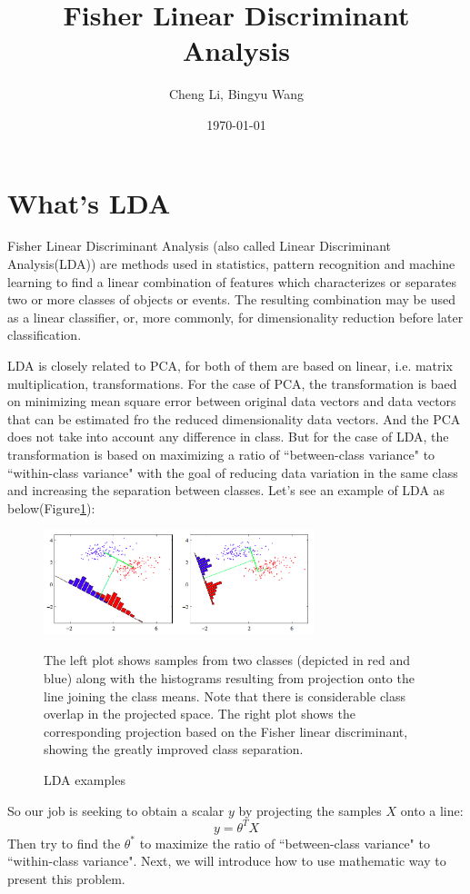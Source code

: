 \documentclass[a4paper]{article}
\title{Fisher Linear Discriminant Analysis}
\author{Cheng Li, Bingyu Wang}
\date{\today}
\begin{document}
\maketitle
\section{What's LDA}


Fisher Linear Discriminant Analysis (also called Linear Discriminant Analysis(LDA)) are methods used in statistics, pattern recognition and machine learning to find a linear combination of features which characterizes or separates two or more classes of objects or events. The resulting combination may be used as a linear classifier, or, more commonly, for dimensionality reduction before later classification.

LDA is closely related to PCA, for both of them are based on linear, i.e. matrix multiplication, transformations. For the case of PCA, the transformation is baed on minimizing mean square error between original data vectors and data vectors that can be estimated fro the reduced dimensionality data vectors. And the PCA does not take into account any difference in class. But for the case of LDA, the transformation is based on maximizing a ratio of ``between-class variance" to ``within-class variance" with the goal of reducing data variation in the same class and increasing the separation between classes. Let's see an example of LDA as below(Figure\ref{fig:example}): 

\begin {figure}[h]
\centering
\includegraphics[width=0.7\textwidth]{./images/example.png}
\caption{\label{fig:example} LDA examples}
\medskip
\small
The left plot shows samples from two classes (depicted in red and blue) along with the histograms resulting from projection onto the line joining the class means. Note that there is considerable class overlap in the projected space. The right plot shows the corresponding projection based on the Fisher linear discriminant, showing the greatly improved class separation.
\end {figure}
So our job is seeking to obtain a scalar  $y$ by projecting the samples $X$ onto a line:
$$
y = \theta^{T}X
$$ 
Then try to find the $\theta^\ast$ to maximize the ratio of ``between-class variance" to ``within-class variance". Next, we will introduce how to use mathematic way to present this problem. 
\end{document}
